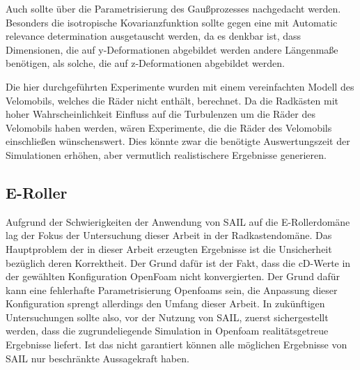 Auch sollte über die Parametrisierung des Gaußprozesses nachgedacht werden.
Besonders die isotropische Kovarianzfunktion sollte gegen eine mit Automatic relevance determination ausgetauscht werden, da es denkbar ist, dass Dimensionen, die auf y-Deformationen abgebildet werden andere Längenmaße benötigen, als solche, die auf z-Deformationen abgebildet werden.

Die hier durchgeführten Experimente wurden mit einem vereinfachten Modell des Velomobils, welches die Räder nicht enthält, berechnet.
Da die Radkästen mit hoher Wahrscheinlichkeit Einfluss auf die Turbulenzen um die Räder des Velomobils haben werden, wären Experimente, die die Räder des Velomobils einschließen wünschenswert.
Dies könnte zwar die benötigte Auswertungszeit der Simulationen erhöhen, aber vermutlich realistischere Ergebnisse generieren.

\subsection{E-Roller}

Aufgrund der Schwierigkeiten der Anwendung von SAIL auf die E-Rollerdomäne lag der Fokus der Untersuchung dieser Arbeit in der Radkastendomäne.
Das Hauptproblem der in dieser Arbeit erzeugten Ergebnisse ist die Unsicherheit bezüglich deren Korrektheit.
Der Grund dafür ist der Fakt, dass die cD-Werte in der gewählten Konfiguration OpenFoam nicht konvergierten.
Der Grund dafür kann eine fehlerhafte Parametrisierung Openfoams sein, die Anpassung dieser Konfiguration sprengt allerdings den Umfang dieser Arbeit.
In zukünftigen Untersuchungen sollte also, vor der Nutzung von SAIL, zuerst sichergestellt werden, dass die zugrundeliegende Simulation in Openfoam realitätsgetreue Ergebnisse liefert.
Ist das nicht garantiert können alle möglichen Ergebnisse von SAIL nur beschränkte Aussagekraft haben.

